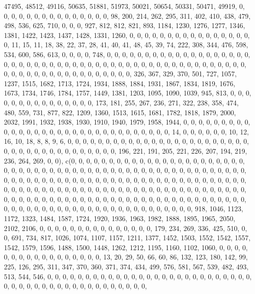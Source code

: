 \documentclass[
]{article}
\begin{document}
47495, 48512, 49116, 50635, 51881, 51973, 50021, 50654, 50331, 50471,
49919, 0, 0, 0, 0, 0, 0, 0, 0, 0, 0, 0, 0, 0, 0, 0, 98, 200, 214, 262,
295, 311, 402, 410, 438, 479, 498, 536, 625, 710, 0, 0, 0, 927, 812,
812, 821, 893, 1184, 1230, 1276, 1277, 1346, 1381, 1422, 1423, 1437,
1428, 1331, 1260, 0, 0, 0, 0, 0, 0, 0, 0, 0, 0, 0, 0, 0, 0, 0, 0, 0, 11,
15, 11, 18, 38, 22, 37, 28, 41, 40, 41, 48, 45, 39, 74, 222, 308, 344,
476, 598, 534, 600, 586, 613, 0, 0, 0, 0, 748, 0, 0, 0, 0, 0, 0, 0, 0,
0, 0, 0, 0, 0, 0, 0, 0, 0, 0, 0, 0, 0, 0, 0, 0, 0, 0, 0, 0, 0, 0, 0, 0,
0, 0, 0, 0, 0, 0, 0, 0, 0, 0, 0, 0, 0, 0, 0, 0, 0, 0, 0, 0, 0, 0, 0, 0,
0, 0, 0, 0, 0, 0, 0, 0, 0, 0, 0, 0, 326, 367, 329, 370, 501, 727, 1057,
1237, 1515, 1682, 1713, 1724, 1934, 1888, 1884, 1931, 1867, 1834, 1819,
1676, 1673, 1734, 1746, 1784, 1757, 1449, 1381, 1203, 1095, 1090, 1039,
945, 813, 0, 0, 0, 0, 0, 0, 0, 0, 0, 0, 0, 0, 0, 0, 0, 173, 181, 255,
267, 236, 271, 322, 238, 358, 474, 480, 559, 731, 877, 822, 1209, 1360,
1513, 1615, 1681, 1782, 1818, 1879, 2000, 2032, 1991, 1932, 1938, 1930,
1910, 1940, 1979, 1958, 1944, 0, 0, 0, 0, 0, 0, 0, 0, 0, 0, 0, 0, 0, 0,
0, 0, 0, 0, 0, 0, 0, 0, 0, 0, 0, 0, 0, 0, 0, 0, 0, 14, 0, 0, 0, 0, 0, 0,
10, 12, 16, 10, 18, 8, 8, 9, 6, 0, 0, 0, 0, 0, 0, 0, 0, 0, 0, 0, 0, 0,
0, 0, 0, 0, 0, 0, 0, 0, 0, 0, 0, 0, 0, 0, 0, 0, 0, 0, 0, 0, 0, 0, 0, 0,
0, 0, 196, 221, 191, 205, 221, 226, 207, 194, 219, 236, 264, 269, 0, 0),
c(0, 0, 0, 0, 0, 0, 0, 0, 0, 0, 0, 0, 0, 0, 0, 0, 0, 0, 0, 0, 0, 0, 0,
0, 0, 0, 0, 0, 0, 0, 0, 0, 0, 0, 0, 0, 0, 0, 0, 0, 0, 0, 0, 0, 0, 0, 0,
0, 0, 0, 0, 0, 0, 0, 0, 0, 0, 0, 0, 0, 0, 0, 0, 0, 0, 0, 0, 0, 0, 0, 0,
0, 0, 0, 0, 0, 0, 0, 0, 0, 0, 0, 0, 0, 0, 0, 0, 0, 0, 0, 0, 0, 0, 0, 0,
0, 0, 0, 0, 0, 0, 0, 0, 0, 0, 0, 0, 0, 0, 0, 0, 0, 0, 0, 0, 0, 0, 0, 0,
0, 0, 0, 0, 0, 0, 0, 0, 0, 0, 0, 0, 0, 0, 0, 0, 0, 0, 0, 0, 0, 0, 0, 0,
0, 0, 0, 0, 0, 0, 0, 0, 0, 0, 0, 0, 0, 0, 0, 0, 0, 0, 0, 0, 0, 0, 0, 0,
0, 0, 0, 0, 0, 0, 0, 0, 0, 918, 1046, 1123, 1172, 1323, 1484, 1587,
1724, 1920, 1936, 1963, 1982, 1888, 1895, 1965, 2050, 2102, 2106, 0, 0,
0, 0, 0, 0, 0, 0, 0, 0, 0, 0, 0, 0, 0, 179, 234, 269, 336, 425, 510, 0,
0, 691, 734, 817, 1026, 1074, 1107, 1157, 1211, 1377, 1452, 1503, 1552,
1542, 1557, 1542, 1579, 1596, 1488, 1500, 1448, 1262, 1212, 1195, 1160,
1102, 1060, 0, 0, 0, 0, 0, 0, 0, 0, 0, 0, 0, 0, 0, 0, 0, 0, 0, 13, 20,
29, 50, 66, 60, 86, 132, 123, 180, 142, 99, 225, 126, 295, 311, 347,
370, 360, 371, 374, 434, 499, 576, 581, 567, 539, 482, 493, 513, 544,
546, 0, 0, 0, 0, 0, 0, 0, 0, 0, 0, 0, 0, 0, 0, 0, 0, 0, 0, 0, 0, 0, 0,
0, 0, 0, 0, 0, 0, 0, 0, 0, 0, 0, 0, 0, 0, 0, 0, 0, 0, 0, 0, 0, 0, 0, 0,
\end{document}

